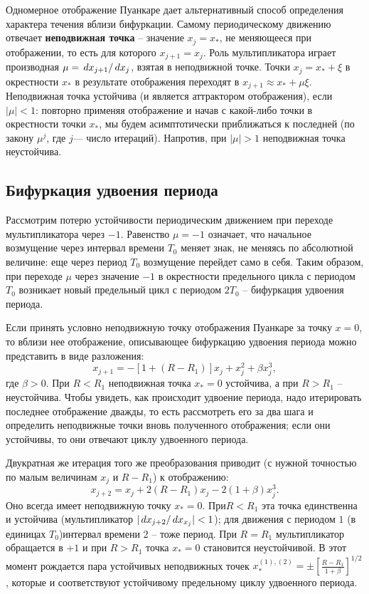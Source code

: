 Одномерное отображение Пуанкаре дает альтернативный способ определения характера течения вблизи бифуркации. 
Самому периодическому движению отвечает \textbf{неподвижная точка} -- значение $x_j = x_*$, не меняющееся при отображении, то есть для которого $x_{j+1} = x_j$. 
Роль мультипликатора играет производная $\mu = \, d x_{j+1}/\, d x_j$, взятая в неподвижной точке. Точки $x_j = x_* + \xi$ в окрестности $x_*$ в результате отображения переходят в $x_{j+1} \approx x_* + \mu \xi$. 
Неподвижная точка устойчива (и является аттрактором отображения), если $|\mu| < 1$: повторно применяя отображение и начав с какой-либо точки в окрестности точки $x_*$, мы будем асимптотически приближаться к последней (по закону $\mu^j$, где $j$— число итераций). Напротив, при $|\mu| > 1$ неподвижная точка неустойчива. 


\subsection{Бифуркация удвоения периода}
Рассмотрим потерю устойчивости периодическим движением при переходе мультипликатора через $-1$. Равенство $\mu = -1$ означает, что начальное возмущение через интервал времени $T_0$ меняет знак, не меняясь по абсолютной величине: еще через период $T_0$ возмущение перейдет само в себя. 
Таким образом, при переходе $\mu$ через значение $-1$ в окрестности предельного цикла с периодом $T_0$ возникает новый предельный цикл с периодом $2 T_0$ -- бифуркация удвоения периода. 

Если принять условно неподвижную точку отображения Пуанкаре за точку $x=0$, то вблизи нее отображение, описывающее бифуркацию удвоения периода можно представить в виде разложения:
$$x_{j+1} = - [1 + (R - R_1)]x_j + x_j^2 + \beta x_j^3,$$ 
где $\beta > 0$. При $R < R_1$ неподвижная точка $x_* = 0$ устойчива, а при $R > R_1$ -- неустойчива. Чтобы увидеть, как происходит удвоение периода, надо итерировать последнее отображение дважды, то есть рассмотреть его за два шага и определить неподвижные точки вновь полученного отображения; если они устойчивы, то они отвечают циклу удвоенного периода.

Двукратная же итерация того же преобразования приводит (с нужной точностью по малым величинам $x_j$ и $R - R_1$) к отображению:
$$x_{j+2} = x_j + 2(R-R_1)x_j - 2(1+\beta)x_j^3.$$
Оно всегда имеет неподвижную точку $x_* = 0$. При$R<R_1$ эта точка единственна и устойчива (мультипликатор $|\, d x_{j+2}/\, d x_{x_j}| < 1$);
для движения с периодом $1$ (в единицах $T_0$)интервал времени $2$ -- тоже период. При $R = R_1$ мультипликатор обращается в $+1$ и при $R>R_1$ точка $x_*=0$ становится неустойчивой.
В этот момент рождается пара устойчивых неподвижных точек $x_*^{(1),(2)} = \pm \left[\frac{R -R_1}{1+\beta}\right]^{1/2}$,
которые и соответствуют устойчивому предельному циклу удвоенного периода.

